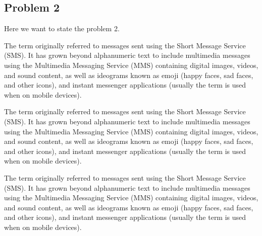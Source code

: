 \documentclass[two column]{article}
\begin{document}
\subsection{Problem 2} \label{subsection.problem2}

Here we want to state the problem 2. 

The term originally referred to messages sent using the Short Message Service (SMS). It has grown beyond alphanumeric text to include multimedia messages using the Multimedia Messaging Service (MMS) containing digital images, videos, and sound content, as well as ideograms known as emoji (happy faces, sad faces, and other icons), and instant messenger applications (usually the term is used when on mobile devices). 

The term originally referred to messages sent using the Short Message Service (SMS). It has grown beyond alphanumeric text to include multimedia messages using the Multimedia Messaging Service (MMS) containing digital images, videos, and sound content, as well as ideograms known as emoji (happy faces, sad faces, and other icons), and instant messenger applications (usually the term is used when on mobile devices). 

The term originally referred to messages sent using the Short Message Service (SMS). It has grown beyond alphanumeric text to include multimedia messages using the Multimedia Messaging Service (MMS) containing digital images, videos, and sound content, as well as ideograms known as emoji (happy faces, sad faces, and other icons), and instant messenger applications (usually the term is used when on mobile devices). 
\end{document}
